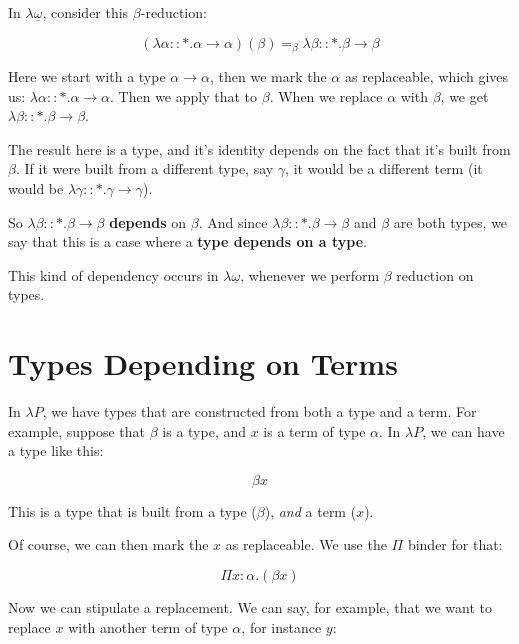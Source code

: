 \documentclass{book}
\numberwithin{equation}{chapter}
\newcommand{\vocab}{\textbf}
\begin{document}
In $\lambda\underline{\omega}$, consider this $\beta$-reduction:

\begin{equation}
(\lambda \alpha :: \ast.\alpha \rightarrow \alpha) (\beta) =_{\beta} \lambda \beta :: \ast.\beta \rightarrow \beta
\end{equation}

Here we start with a type $\alpha \rightarrow \alpha$, then we mark the $\alpha$ as replaceable, which gives us: $\lambda \alpha :: \ast.\alpha \rightarrow \alpha$.  Then we apply that to $\beta$. When we replace $\alpha$ with $\beta$, we get $\lambda \beta :: \ast.\beta \rightarrow \beta$. 

The result here is a type, and it's identity depends on the fact that it's built from $\beta$. If it were built from a different type, say $\gamma$, it would be a different term (it would be $\lambda \gamma :: \ast.\gamma \rightarrow \gamma$).

So $\lambda \beta :: \ast.\beta \rightarrow \beta$ \vocab{depends} on $\beta$. And since $\lambda \beta :: \ast.\beta \rightarrow \beta$ and $\beta$ are both types, we say that this is a case where a \vocab{type depends on a type}.

This kind of dependency occurs in $\lambda\underline{\omega}$, whenever we perform $\beta$ reduction on types.

\section{Types Depending on Terms}

In $\lambda P$, we have types that are constructed from both a type and a term. For example, suppose that $\beta$ is a type, and $x$ is a term of type $\alpha$. In $\lambda P$, we can have a type like this:

\begin{equation}
\beta x
\end{equation}

\noindent
This is a type that is built from a type ($\beta$), \textit{and} a term ($x$). 

Of course, we can then mark the $x$ as replaceable. We use the $\Pi$ binder for that:

\begin{equation}
\Pi x : \alpha.(\beta x)
\end{equation}

\noindent
Now we can stipulate a replacement. We can say, for example, that we want to replace $x$ with another term of type $\alpha$, for instance $y$:
\end{document}
